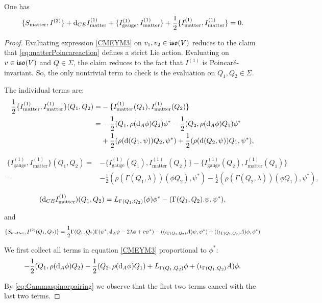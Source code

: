 \documentclass[10pt, oneside]{article}
\newcommand{\gauge}{\mathrm{gauge}}
\newcommand{\matter}{\mathrm{matter}}
\begin{document}
\begin{lemma} 
One has
\begin{equation}\label{CMEYM3}
\{S_{\matter}, I^{(2)}\} + \d_{CE} I_{\matter}^{(1)} + \{I_{\gauge}^{(1)}, I_{\matter}^{(1)}\} + \frac{1}{2} \{I_{\matter}^{(1)}, I_{\matter}^{(1)}\} = 0 .
\end{equation}
\end{lemma}
\begin{proof}
Evaluating expression \eqref{CMEYM3} on $v_1,v_2 \in \mathfrak{iso}(V)$ reduces to the claim that \eqref{eq:matterPoincareaction} defines a strict Lie action. Evaluating on $v \in \mathfrak{iso}(V)$ and $Q \in \Sigma$, the claim reduces to the fact that $I^{(1)}$ is Poincar\'{e}-invariant. So, the only nontrivial term to check is the evaluation on $Q_1,Q_2 \in \Sigma$. 

The individual terms are:
\begin{align*}
\frac{1}{2}\{I_{\matter}^{(1)}, I_{\matter}^{(1)}\}(Q_1, Q_2) =& -\{I_{\matter}^{(1)}(Q_1), I_{\matter}^{(1)}(Q_2)\} \\
=&-\frac{1}{2}(Q_1, \rho(\d_A \phi) Q_2)\phi^* - \frac{1}{2}(Q_2, \rho(\d_A \phi)Q_1)\phi^* \\ &  +\frac{1}{2}(\rho(\d(Q_1,\psi))Q_2, \psi^*) +\frac{1}{2} (\rho(\d(Q_2, \psi)) Q_1, \psi^*),
\end{align*}

\begin{align*}
\{I_{\gauge}^{(1)}, I_{\matter}^{(1)}\}(Q_1, Q_2) = &-\{I_{\gauge}^{(1)}(Q_1), I_{\matter}^{(1)}(Q_2)\} - \{I_{\gauge}^{(1)}(Q_2), I_{\matter}^{(1)}(Q_1)\} \\
=& -\frac{1}{2}(\rho(\Gamma(Q_1, \lambda))(\phi Q_2), \psi^*) - \frac{1}{2}(\rho(\Gamma(Q_2, \lambda))(\phi Q_1), \psi^*),
\end{align*}

\[
(\d_{CE}I_{\matter}^{(1)})(Q_1,Q_2) = L_{\Gamma(Q_1,Q_2)} (\phi)\phi^* - (\Gamma(Q_1,Q_2).\psi, \psi^*),
\]

and
\[
\{S_{\matter}, I^{(2)}(Q_1,Q_2)\} =  \frac{1}{2} \Gamma(Q_1,Q_2) \Gamma(\psi^*, \sd \d_A \psi - 2 \lambda\phi + c\psi^*) - ((\iota_{\Gamma(Q_1, Q_2)} A)\psi, \psi^*) + ((\iota_{\Gamma(Q_1, Q_2)} A)\phi, \phi^*)
\]

We first collect all terms in equation \eqref{CMEYM3} proportional to $\phi^*$:
\[
-\frac{1}{2} (Q_1, \rho({\rm d}_A\phi) Q_2) - \frac{1}{2} (Q_2, \rho({\rm d}_A \phi) Q_1) + L_{\Gamma(Q_1,Q_2)} \phi + (\iota_{\Gamma(Q_1, Q_2)} A)\phi.
\]

By \eqref{eq:Gammaspinorpairing} we observe that the first two terms cancel with the last two terms.


\end{proof}
\end{document}
